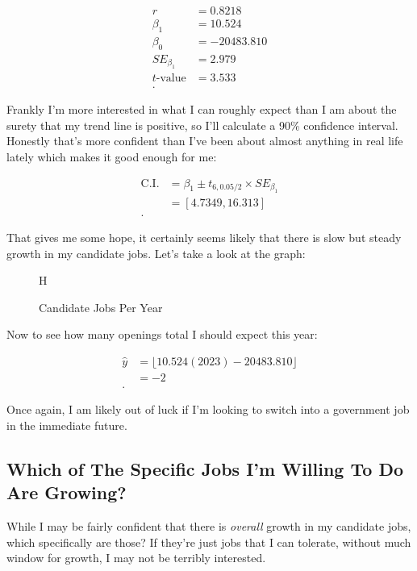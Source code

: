 \documentclass[letterpaper]{article}
\theoremstyle{definition}
\begin{document}
\begin{align*}
	r &= 0.8218\\
	\beta_1&= 10.524 \\
	\beta_0	&= -20483.810 \\
	SE_{\beta_1} &= 2.979 \\
	t \text{-value} &= 3.533 \\
.\end{align*}	

Frankly I'm more interested in what I can roughly expect than I am about the surety that
my trend line is positive, so I'll calculate a 90\% confidence interval. Honestly that's
more confident than I've been about almost anything in real life lately which makes it good
enough for me:

\begin{align*}
	\text{C.I.} &= \beta_1 \pm t_{6, 0.05 / 2} \times SE_{\beta_1} \\
				&= [4.7349, 16.313] \\
.\end{align*}

That gives me some hope, it certainly seems likely that there is slow but steady growth in
my candidate jobs. Let's take a look at the graph:
\begin{figure}{H}
	\center
	\caption{Candidate Jobs Per Year}
	\label{fig:4}
\end{figure}

Now to see how many openings total I should expect this year:

\begin{align*}
	\hat{y} &= \lfloor 10.524(2023)-20483.810 \rfloor \\
	&=  -2\\
.\end{align*}


Once again, I am likely out of luck if I'm looking to switch into a government job in the immediate future.

\subsection{Which of The Specific Jobs I'm Willing To Do Are Growing?}

While I may be fairly confident that there is \emph{overall} growth in my candidate jobs,
which specifically are those? If they're just jobs that I can tolerate, without much
window for growth, I may not be terribly interested.
\end{document}
